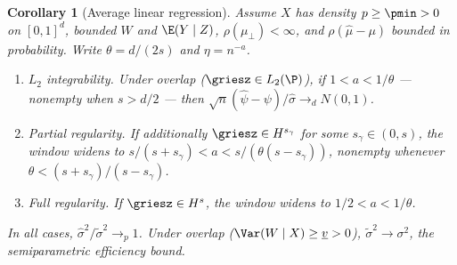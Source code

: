 \documentclass{article}
\newtheorem{corollary}[theorem]{Corollary}
\begin{document}
\begin{corollary}[Average linear regression]
\label{cor:regression}
Assume $X$ has density $p \ge \pmin > 0$
on $[0,1]^d$,
bounded $W$ and $\E(Y \mid Z)$,
$\rho(\mu_\perp) < \infty$,
and $\rho(\hat\mu - \mu)$ bounded in probability.
Write $\theta = d/(2s)$ and $\eta = n^{-a}$.
\begin{enumerate}[label=\textup{(\roman*)}]
\item\label{case:reg-structural}
\textit{$L_2$ integrability.}
Under overlap ($\griesz \in L_2(\P)$),
if $1 < a < 1/\theta$
--- nonempty when $s > d/2$ ---
then
$\sqrt{n}(\hat\psi - \psi)/\hat\sigma \to_d N(0,1)$.
\item\label{case:reg-comparison}
\textit{Partial regularity.}
If additionally $\griesz \in H^{s_\gamma}$
for some $s_\gamma \in (0,s)$,
the window widens to
$s/(s+s_\gamma) < a < s/(\theta(s-s_\gamma))$,
nonempty whenever $\theta < (s+s_\gamma)/(s - s_\gamma)$.
\item\label{case:reg-full}
\textit{Full regularity.}
If $\griesz \in H^s$,
the window widens to
$1/2 < a < 1/\theta$.
\end{enumerate}
In all cases,
$\hat\sigma^2 / \tilde\sigma^2 \to_p 1$.
Under overlap
($\Var(W \mid X) \ge \underline{v} > 0$),
$\tilde\sigma^2 \to \sigma^2$,
the semiparametric efficiency bound.
\end{corollary}
\end{document}
